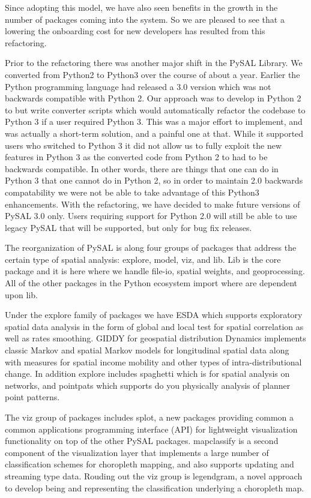 \documentclass[11pt]{article}
\begin{document}
Since adopting this model, we have also seen benefits in the growth in the number
of packages coming into the system. So we are pleased to see that a lowering the
onboarding cost for new developers has resulted from this refactoring.


Prior to the refactoring there was another major shift in the PySAL Library. We
converted from Python2 to Python3 over the course of about a year. Earlier the
Python programming language had released a 3.0 version which was not backwards
compatible with Python 2. Our approach was to develop in Python 2 to but write
converter scripts which would automatically refactor the codebase to Python 3
if a user required Python 3. This was a major effort to implement, and was
actually a short-term solution, and a painful one at that. While it supported
users who switched to Python 3 it did not allow us to fully exploit the new
features in Python 3 as the converted code from Python 2 to had to be backwards
compatible. In other words, there are things that one can do in Python 3 that
one cannot do in Python 2, so in order to maintain 2.0 backwards compatability
we were not be able to take advantage of this Python3 enhancements. With the
refactoring, we have decided to make future versions of PySAL 3.0 only. Users
requiring support for Python 2.0 will still be able to use legacy PySAL that
will be supported, but only for bug fix releases.


The reorganization of PySAL is along four groups of packages that address the
certain type of spatial analysis: explore, model, viz, and lib. Lib is the core
package and it is here where we handle file-io, spatial weights, and
geoprocessing. All of the other packages in the Python ecosystem import where
are dependent upon lib.

Under the explore family of packages we have ESDA which supports exploratory
spatial data analysis in the form of global and local test for spatial
correlation as well as rates smoothing. GIDDY for geospatial distribution
Dynamics implements classic Markov and spatial Markov models for longitudinal
spatial data along with measures for spatial income mobility and other types of
intra-distributional change. In addition explore includes spaghetti which is
for spatial analysis on networks, and pointpats which supports do you
physically analysis of planner point patterns.

The viz group of packages includes splot, a new packages providing common a
common applications programming interface (API) for lightweight visualization
functionality on top of the other PySAL packages. mapclassify is a second
component of the visualization layer that implements a large number of
classification schemes for choropleth mapping, and also supports updating and
streaming type data. Rouding out the viz group is legendgram, a novel approach
to develop being and representing the classification underlying a choropleth
map.
\end{document}
